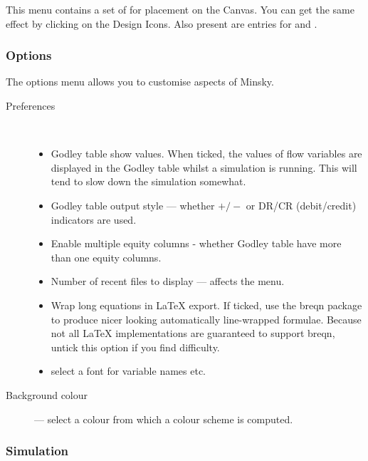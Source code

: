 \label{Insert}

This menu contains a set of 
for placement on the Canvas. You can get the same effect by clicking
on the Design Icons. Also present are entries for  and .

\subsubsection{Options}

\label{Options}

The options menu allows you to customise aspects of Minsky.
\begin{description}
\item [{Preferences}] %
\mbox{%
%
}
\begin{itemize}
\item Godley table show values. When ticked, the values of flow variables
are displayed in the Godley table whilst a simulation is running.
This will tend to slow down the simulation somewhat. 
\item Godley table output style --- whether $+/-$ or DR/CR (debit/credit)
indicators are used. 
\item Enable multiple equity columns - whether Godley table have more than
one equity columns. 
\item Number of recent files to display --- affects the  menu. 
\item \label{wrap-equations} Wrap long equations in LaTeX export. If ticked,
use the breqn package to produce nicer looking automatically line-wrapped
formulae. Because not all LaTeX implementations are guaranteed to
support breqn, untick this option if you find difficulty. 
\item \label{font} select a font for variable names etc. 
\end{itemize}
\item [{Background colour}] --- select a colour from which a colour scheme
is computed.
\end{description}

\subsubsection{Simulation}

